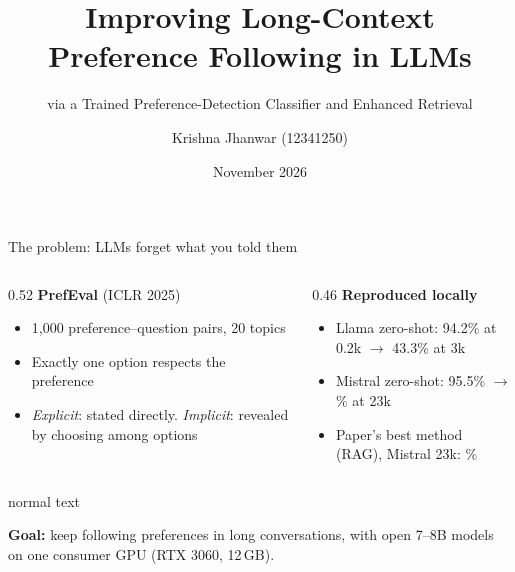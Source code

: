 \documentclass[aspectratio=169,11pt]{beamer}
\title{Improving Long-Context Preference Following in LLMs}
\subtitle{via a Trained Preference-Detection Classifier and Enhanced Retrieval}
\author{Krishna Jhanwar (12341250)}
\date{November 2026}
\newcommand{\takeaway}[1]{\vspace{4pt}\begin{beamercolorbox}[sep=6pt,rounded=true]{normal text}\colorbox{boxblue}{\parbox{0.93\linewidth}{\small #1}}\end{beamercolorbox}}
\begin{document}
\begin{frame}[plain]
\titlepage
\end{frame}

\begin{frame}{The problem: LLMs forget what you told them}
\begin{center}
\end{center}
\vspace{2pt}
\begin{columns}[T]
\begin{column}{0.52\textwidth}
\textbf{PrefEval} (ICLR 2025)
\begin{itemize}\small
  \item 1{,}000 preference--question pairs, 20 topics
  \item Exactly one option respects the preference
  \item \emph{Explicit}: stated directly. \emph{Implicit}: revealed by choosing among options
\end{itemize}
\end{column}
\begin{column}{0.46\textwidth}
\textbf{Reproduced locally}
\begin{itemize}\small
  \item Llama zero-shot: 94.2\% at 0.2k $\rightarrow$ 43.3\% at 3k
  \item Mistral zero-shot: 95.5\% $\rightarrow$ \qMiZsTwentyThree\% at 23k
  \item Paper's best method (RAG), Mistral 23k: \qMiRagTwentyThree\%
\end{itemize}
\end{column}
\end{columns}
\takeaway{\textbf{Goal:} keep following preferences in long conversations, with open 7--8B models on one consumer GPU (RTX 3060, 12\,GB).}
\end{frame}
\end{document}
